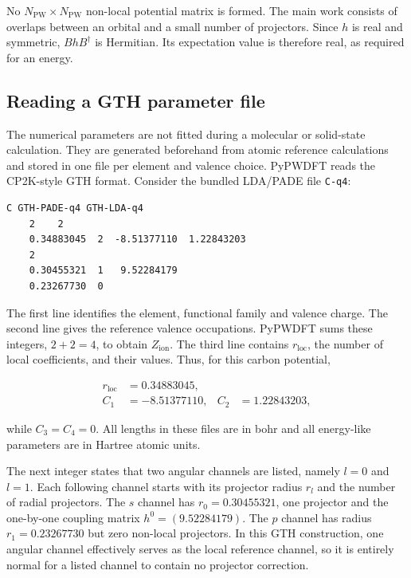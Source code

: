 No $N_{\text{PW}}\times N_{\text{PW}}$ non-local potential matrix is formed. The main work consists of overlaps between an orbital and a small number of projectors. Since $h$ is real and symmetric, $BhB^{\dagger}$ is Hermitian. Its expectation value is therefore real, as required for an energy.

%
%
%
\subsection{Reading a GTH parameter file}

The numerical parameters are not fitted during a molecular or solid-state calculation. They are generated beforehand from atomic reference calculations and stored in one file per element and valence choice. PyPWDFT reads the CP2K-style GTH format. Consider the bundled LDA/PADE file \texttt{C-q4}:

\begin{verbatim}
C GTH-PADE-q4 GTH-LDA-q4
    2    2
    0.34883045  2  -8.51377110  1.22843203
    2
    0.30455321  1   9.52284179
    0.23267730  0
\end{verbatim}

The first line identifies the element, functional family and valence charge. The second line gives the reference valence occupations. PyPWDFT sums these integers, $2+2=4$, to obtain $Z_{\text{ion}}$. The third line contains $r_{\text{loc}}$, the number of local coefficients, and their values. Thus, for this carbon potential,

\begin{align}
    r_{\text{loc}} &= 0.34883045,\\
    C_{1} &= -8.51377110, & C_{2} &= 1.22843203,
\end{align}

while $C_{3}=C_{4}=0$. All lengths in these files are in bohr and all energy-like parameters are in Hartree atomic units.

The next integer states that two angular channels are listed, namely $l=0$ and $l=1$. Each following channel starts with its projector radius $r_{l}$ and the number of radial projectors. The $s$ channel has $r_{0}=0.30455321$, one projector and the one-by-one coupling matrix $h^{0}=(9.52284179)$. The $p$ channel has radius $r_{1}=0.23267730$ but zero non-local projectors. In this GTH construction, one angular channel effectively serves as the local reference channel, so it is entirely normal for a listed channel to contain no projector correction.

